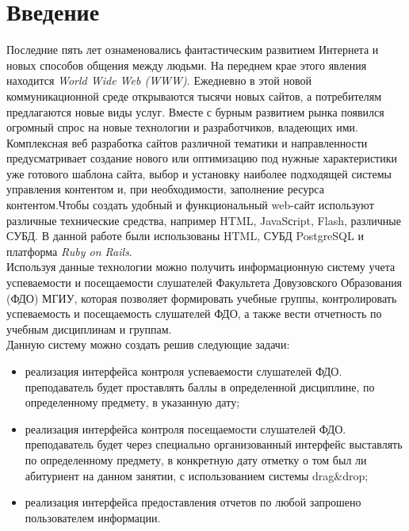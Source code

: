 \section{Введение}

Последние пять лет ознаменовались фантастическим развитием Интернета и новых способов общения между людьми. На переднем крае этого явления находится \textit{World Wide Web (WWW)}. Ежедневно в этой новой коммуникационной среде открываются тысячи новых сайтов, а потребителям предлагаются новые виды услуг. Вместе с бурным развитием рынка появился огромный спрос на новые технологии и разработчиков, владеющих ими. Комплексная веб разработка сайтов различной тематики и направленности предусматривает создание нового или оптимизацию под нужные характеристики уже готового шаблона сайта, выбор и установку наиболее подходящей системы управления контентом и, при необходимости, заполнение ресурса контентом.Чтобы создать удобный и функциональный web-сайт используют различные технические средства, например HTML,  JavaSсript, Flash, различные СУБД. В данной работе были использованы HTML, СУБД PostgreSQL и платформа \textit{Ruby on Rails}.\\
Используя данные технологии можно получить информационную систему учета успеваемости и посещаемости слушателей Факультета Довузовского Образования (ФДО) МГИУ,  которая позволяет формировать учебные группы, контролировать успеваемость и посещаемость слушателей ФДО, а также вести отчетность по учебным дисциплинам и группам.\\
Данную систему можно создать решив следующие задачи:\\
\begin{itemize}
\item реализация интерфейса контроля успеваемости слушателей ФДО. преподаватель будет проставлять баллы в  определенной дисциплине, по определенному предмету, в указанную дату;\\ 
\item реализация интерфейса контроля посещаемости слушателей ФДО. преподаватель будет через специально организованный интерфейс выставлять по определенному предмету, в конкретную дату отметку о том был ли абитуриент на данном занятии, с использованием системы drag\&drop;\\
\item реализация интерфейса предоставления отчетов по любой запрошено пользователем информации.\\
\end{itemize}
